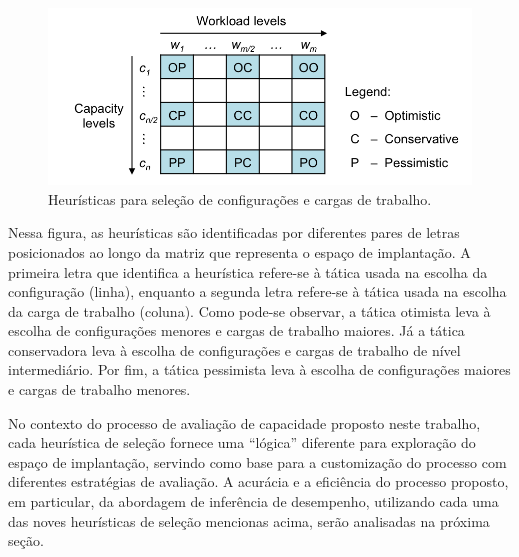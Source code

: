 \documentclass[10pt,conference,compsocconf]{IEEEtran}
\begin{document}
\begin{figure}[t]
  \begin{center}
    \includegraphics[trim = 0mm 0mm 0mm 0mm, scale=.55]{img/heuristics2}
  \end{center}
  \caption{\label{fig:heuristicas}Heurísticas para seleção de configurações e cargas de trabalho.}
\end{figure}


Nessa figura, as heurísticas são identificadas por diferentes pares de letras posicionados ao longo da matriz que representa o espaço de implantação. A primeira letra que identifica a heurística refere-se à tática usada na escolha da configuração (linha), enquanto a segunda letra refere-se à tática usada na escolha da carga de trabalho (coluna). Como pode-se observar, a tática otimista leva à escolha de configurações menores e cargas de trabalho maiores. Já a tática conservadora leva à escolha de configurações e cargas de trabalho de nível intermediário. Por fim, a tática pessimista leva à escolha de configurações maiores e cargas de trabalho menores.
 
 
 
No contexto do processo de avaliação de capacidade proposto neste trabalho, cada heurística de seleção fornece uma ``lógica'' diferente para exploração do espaço de implantação, servindo como base para a customização do processo com diferentes estratégias de avaliação. A acurácia e a eficiência do processo proposto, em particular, da abordagem de inferência de desempenho, utilizando cada uma das noves heurísticas de seleção mencionas acima, serão analisadas na próxima seção. 

\end{document}
